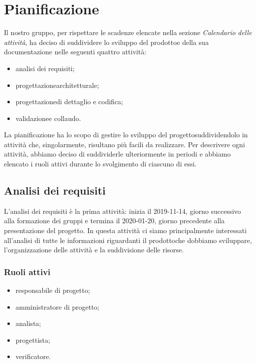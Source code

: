 \section{Pianificazione} 
Il nostro gruppo, per rispettare le scadenze elencate nella sezione \textit{Calendario delle attività}, ha deciso di suddividere lo sviluppo del prodotto\glosp e della sua documentazione nelle seguenti quattro attività:
\begin{itemize}
	\item analisi dei requisiti;
	\item progettazione\glosp architetturale;
	\item progettazione\glosp di dettaglio e codifica;
	\item validazione\glosp e collaudo.
\end{itemize}
La pianificazione ha lo scopo di gestire lo sviluppo del progetto\glosp suddividendolo in attività che, singolarmente, risultano più facili da realizzare. Per descrivere ogni attività, abbiamo deciso di suddividerle ulteriormente in periodi e abbiamo elencato i ruoli attivi durante lo svolgimento di ciascuno di essi.

\subsection{Analisi dei requisiti}
L'analisi dei requisiti è la prima attività: inizia il 2019-11-14, giorno successivo alla formazione dei gruppi e termina il 2020-01-20, giorno precedente alla presentazione del progetto\glo. In questa attività ci siamo principalmente interessati all'analisi di tutte le informazioni riguardanti il prodotto\glosp che dobbiamo sviluppare, l'organizzazione delle attività e la suddivisione delle risorse.

\subsubsection{Ruoli attivi}
\begin{itemize}
	\item responsabile di progetto\glo;
	\item amministratore di progetto\glo;
	\item analista;
	\item progettista;
	\item verificatore.
\end{itemize}

